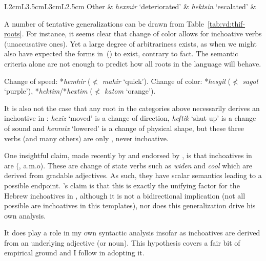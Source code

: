 \begin{exe}
\begin{xlist}
\begin{xlist}
\begin{exe}
\begin{exe}
\begin{xlist}
\begin{exe}
\begin{xlist}
\begin{exe}
\begin{xlist}
\begin{xlist}
\begin{table}
\begin{tabularx}{\textwidth}{L{2cm}L{3.5cm}L{3cm}L{2.5cm}}
	Other & \emph{hexmir} `deteriorated' & \emph{hek{ts}in} `escalated' &  \\
\lspbottomrule
 	\end{tabularx}
\caption{Lexical semantic classes for alternating verbs in {\thif} and transitive foils.\label{tab:vd:thif-roots}}
\end{table}



A number of tentative generalizations can be drawn from Table~\ref{tab:vd:thif-roots}. For instance, it seems clear that change of color allows for inchoative verbs (unaccusative ones). Yet a large degree of arbitrariness exists, as when we might also have expected the forms in~(\nextx) to exist, contrary to fact. The semantic criteria alone are not enough to predict how all roots in the language will behave.
 \begin{exe}
 \ex  
 \begin{xlist} 
 	\ex  Change of speed: 
		*\emph{hemhir} ($\nless$ \emph{mahir} `quick').
 	\ex  Change of color: 
		*\emph{hesgil} ($\nless$ \emph{sagol} `purple'), *\emph{hektim}/*\emph{hextim} ($\nless$ \emph{katom} `orange').
 \z
\z 

It is also not the case that any root in the categories above necessarily derives an inchoative in {\thif}: \emph{heziz} `moved' is a change of direction, \emph{heʃtik} `shut up' is a change of sound and \emph{henmix} `lowered' is a change of physical shape, but these three verbs (and many others) are only , never inchoative.

One insightful claim, made recently by \cite{lev16} and endorsed by \cite{kastner19tlr}, is that inchoatives in {\thif} are \textbf{} (\citealt{dowty91,hayetal99,rotsteinwinter04,kennedylevin08,bobaljik12,mcnally17}, a.m.o). These are change of state verbs such as \emph{widen} and \emph{cool} which are derived from gradable adjectives. As such, they have scalar semantics leading to a possible endpoint. \citeauthor{lev16}'s claim is that this is exactly the unifying factor for the Hebrew inchoatives in {\thif}, although it is not a bidirectional implication (not all possible  are inchoatives in this templates), nor does this generalization drive his own analysis.

It does play a role in my own syntactic analysis insofar as inchoatives are derived from an underlying adjective (or noun). This hypothesis covers a fair bit of empirical ground and I follow \cite{lev16} in adopting it. 


\end{xlist}
\end{exe}
\end{xlist}
\end{xlist}
\end{exe}
\end{xlist}
\end{exe}
\end{xlist}
\end{exe}
\end{exe}
\end{xlist}
\end{xlist}
\end{exe}
